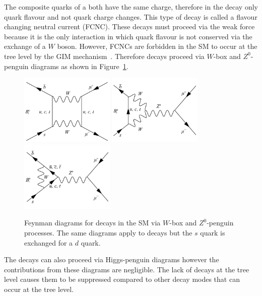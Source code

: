 The composite quarks of a \bsd both have the same charge, therefore in the decay \bmumu only quark flavour and not quark charge changes. This type of decay is called a flavour changing neutral current (FCNC). These decays must proceed via the weak force because it is the only interaction in which quark flavour is not conserved via the exchange of a $W$ boson. However, FCNCs are forbidden in the SM to occur at the tree level by the GIM mechanism~\cite{PhysRevD.2.1285}. Therefore \bmumu decays proceed via $W$-box and $Z^0$-penguin diagrams as shown in Figure~\ref{fig:SM_diag}.

\begin{figure}[htbp]
    \centering
        \includegraphics[width=0.4\textwidth]{./Figs/Theory/W_diagram.pdf}
        \includegraphics[width=0.4\textwidth]{./Figs/Theory/Z0_penguin_v1.pdf}
        \includegraphics[width=0.4\textwidth]{./Figs/Theory/Z0_penguin_v2.pdf}
    \caption{Feynman diagrams for \bsmumu decays in the SM via $W$-box and $Z^0$-penguin processes. The same diagrams apply to \bdmumu decays but the $s$ quark is exchanged for a $d$ quark.}
    \label{fig:SM_diag}
\end{figure}

The decays can also proceed via Higgs-penguin diagrams however the contributions from these diagrams are negligible. %
The lack of \bmumu decays at the tree level causes them to be suppressed compared to other \bsd decay modes that can occur at the tree level.

